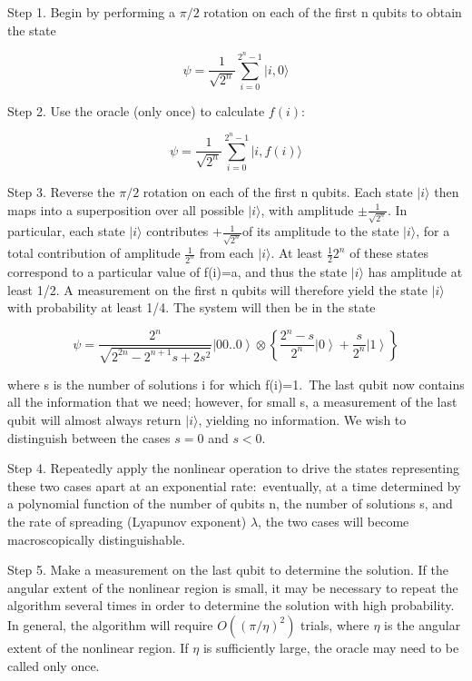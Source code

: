 \documentclass[12pt]{article}
\begin{document}
Step 1. Begin by performing a $\pi/2$ rotation on each of the first n qubits
to obtain the state%

\begin{equation}
\psi=\frac{1}{\sqrt{2^{n}}}\sum\limits_{i=0}^{2^{n}-1}|i,0\rangle
\end{equation}

Step 2. Use the oracle (only once) to calculate $f(i)$:%

\begin{equation}
\psi=\frac{1}{\sqrt{2^{n}}}\sum\limits_{i=0}^{2^{n}-1}|i,f(i)\rangle
\end{equation}

Step 3. Reverse the $\pi/2$ rotation on each of the first n qubits. Each
state $\vert i \rangle$ then maps into a superposition over all possible
$\vert i \rangle$, with amplitude $\pm\frac{1}{\sqrt{2^{n}}}$. In particular, each state
$\vert i \rangle$ contributes $+\frac{1}{\sqrt{2^{n}}}$of its amplitude to the state
$\vert i \rangle$, for a total contribution of amplitude $\frac{1}{2^{n}}$ from each
$\vert i \rangle$. At least $\frac{1}{2}2^{n}$ of these states correspond to a particular value
of f(i)=a, and thus the state
$\vert i \rangle$
has amplitude at least 1/2. A measurement on the first n qubits will therefore
yield the state
$\vert i \rangle$
with probability at least 1/4. The system will then be in the state%

\begin{equation}
\psi=\frac{2^{n}}{\sqrt{2^{2n}-2^{n+1}s+2s^{2}}}\left|  00..0\right\rangle
\otimes\left\{  \frac{2^{n}-s}{2^{n}}\left|  0\right\rangle +\frac{s}{2^{n}%
}\left|  1\right\rangle \right\}
\end{equation}

where s is the number of solutions i for which f(i)=1.\ The last qubit now
contains all the information that we need; however, for small s, a measurement
of the last qubit will almost always return
$\vert i \rangle$, yielding no information. We wish to distinguish between the cases $s=0$ and $s<0$.

Step 4. Repeatedly apply the nonlinear operation to drive the states
representing these two cases apart at an exponential rate:\ eventually, at a
time determined by a polynomial function of the number of qubits n, the number
of solutions s, and the rate of spreading (Lyapunov exponent) $\lambda$, the
two cases will become macroscopically distinguishable.

Step 5. Make a measurement on the last qubit to determine the solution. If the
angular extent of the nonlinear region is small, it may be necessary to repeat
the algorithm several times in order to determine the solution with high
probability. In general, the algorithm will require $O((\pi/\eta)^{2})$
trials, where $\eta$ is the angular extent of the nonlinear region. If $\eta$
is sufficiently large, the oracle may need to be called only once.
\end{document}
